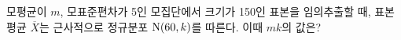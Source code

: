 모평균이 $m$, 모표준편차가 5인 모집단에서 크기가 150인 표본을 임의추출할 때, 표본평균 $\overline{X}$는 근사적으로 정규분포 $\mathrm{N}(60{,}\mkern3mu\mathopen{}k)$를 따른다. 이때 $mk$의 값은?
